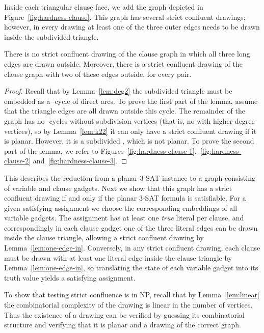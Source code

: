 \documentclass{llncs}
\begin{document}
Inside each triangular clause face, we add the graph depicted in Figure~\ref {fig:hardness-clause}. This graph has several strict confluent drawings; however, in every drawing at least one of the three outer edges needs to be drawn inside the subdivided triangle.





\begin {lemma}\label{lem:one-edge-in}
  There is no strict confluent drawing of the clause graph in which all three long edges are drawn outside. Moreover, there is a strict confluent drawing of the clause graph with two of these edges outside, for every pair.
\end {lemma}

\begin {proof}
  Recall that by Lemma~\ref {lem:deg2} the subdivided triangle must be embedded as a -cycle of direct arcs.
To prove the first part of the lemma, assume that the triangle edges are all drawn outside this cycle.
  The remainder of the graph has no -cycles without subdivision vertices (that is, no  with higher-degree vertices), so by Lemma~\ref {lem:k22} it can only have a strict confluent drawing if it is planar. However, it is a subdivided , which is not planar.  To prove the second part of the lemma, we refer to Figures~\ref {fig:hardness-clause-1},~\ref {fig:hardness-clause-2} and~\ref {fig:hardness-clause-3}.
\end {proof}



This describes the reduction from a planar 3-SAT instance to a graph consisting of variable and clause gadgets. Next we show that this graph has a strict confluent drawing if and only if the planar 3-SAT formula is satisfiable. For a given satisfying assignment we choose the corresponding embeddings of all variable gadgets. The assignment has at least one \emph{true} literal per clause, and correspondingly in each clause gadget one of the three literal edges can be drawn inside the clause triangle, allowing a strict confluent drawing by Lemma~\ref{lem:one-edge-in}. Conversely, in any strict confluent drawing, each clause must be drawn with at least one literal edge inside the clause triangle by Lemma~\ref{lem:one-edge-in}, so translating the state of each variable gadget into its truth value yields a satisfying assignment.

To show that testing strict confluence is in NP, recall that by Lemma~\ref{lem:linear} the combinatorial complexity of the drawing is linear in the number of vertices. Thus the existence of a drawing can be verified by guessing its combinatorial structure and verifying that it is planar and a drawing of the correct graph.
\end{document}
